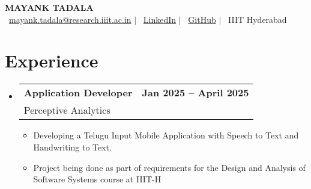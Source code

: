 \documentclass[a4paper,10pt]{article}
\makeatletter
\newcommand{\resumeItem}[1]{\item[\textcolor{bulletcolor}{\textbullet}] \small{#1}}
\newcommand{\resumeSubheading}[4]{
  \vspace{-2pt}\item
    \begin{tabular*}{0.97\textwidth}[t]{l@{\extracolsep{\fill}}r}
      \textbf{#1} & \textbf{\small #2} \\
      {\small #3} & {\small #4} \\
    \end{tabular*}\vspace{-7pt}
}
\makeatother
\begin{document}
\begin{center}
    \textbf{\Huge MAYANK TADALA} \\
    \vspace{1mm}
    \small
    \faEnvelope\ \href{mailto:mayank.tadala@research.iiit.ac.in}{mayank.tadala@research.iiit.ac.in} $|$
    \faLinkedin\ \href{https://www.linkedin.com/in/mayank-ts-92b9031b6/}{LinkedIn} $|$
    \faGithub\ \href{https://github.com/mayank3135432}{GitHub} $|$
    \faMapMarker\ IIIT Hyderabad
\end{center}

\section{Experience}
\begin{itemize}[leftmargin=0.15in, label={}]
    \resumeSubheading
        {Application Developer}{Jan 2025 -- April 2025}
        {Perceptive Analytics}{}
        \begin{itemize}[leftmargin=0.15in]
            \resumeItem{Developing a Telugu Input Mobile Application with Speech to Text and Handwriting to Text.}
            \resumeItem{Project being done as part of requirements for the Design and Analysis of Software Systems course at IIIT-H}
        \end{itemize}
\end{itemize}

\end{document}

